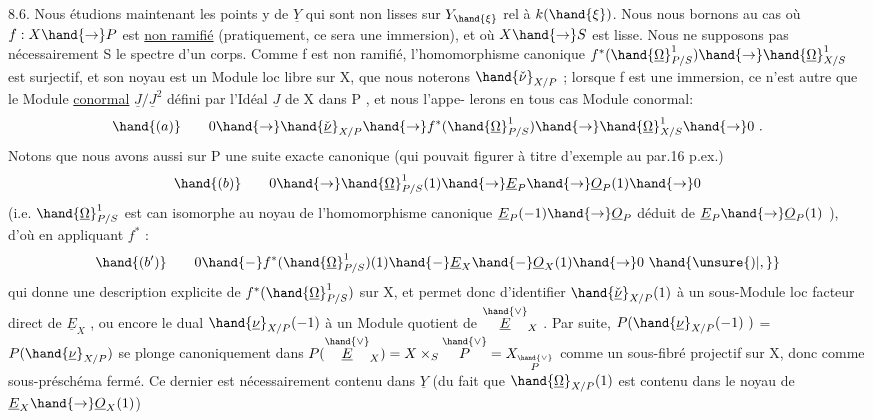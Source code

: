 
8.6. Nous étudions maintenant les points  y de $\underline{Y}$ qui sont non lisses
sur $Y_{\hand{\xi}}$ rel à $k(\hand{\xi})$. Nous nous  bornons au cas où  $f:X\hand{\to} P$  est \uline{non ramifié}
(pratiquement, ce sera une immersion), et où $X\hand{\to} S$ est lisse.  Nous ne
supposons pas nécessairement S le spectre d'un corps.  
 Comme
f  est non ramifié, l'homomorphisme canonique   $f^*(\hand{\underline{\Omega}}^1_{P/S})\hand{\to}\hand{\underline{\Omega}}^1_{X/S}$
est surjectif, et son noyau est un Module loc libre sur X, que nous
noterons  $\hand{\check{\nu}}_{X/P}$ ; lorsque f est une immersion, ce n'est autre que le
Module \uline{conormal}  $\underline{J}/\underline{J}^2$  défini par l'Idéal $\underline{J}$ de X dans P , et nous l'appe-%
lerons en tous cas Module conormal:
\[ \hand{(a)} \qquad 0\hand{\to}\hand{\check{\underline{\nu}}}_{X/P}\hand{\to} f^*(\hand{\underline{\Omega}}^1_{P/S})\hand{\to}\hand{\underline{\Omega}}^1_{X/S}\hand{\to} 0 \ . \]
\placedmargin{\hand{$|||$}}
Notons que nous avons aussi sur  P  une suite exacte canonique
(qui pouvait figurer à titre d'exemple au par.16 p.ex.)
\[ \hand{(b)} \qquad 0\hand{\to}\hand{\underline{\Omega}}^1_{P/S}(1)\hand{\to}\underline{E}_P\hand{\to}\underline{O}_P(1)\hand{\to} 0 \]
(i.e. $\hand{\underline{\Omega}}^1_{P/S}$ est can isomorphe au noyau de l'homomorphisme canonique
$\underline{E}_P(-1)\hand{\to}\underline{O}_P$  déduit de $\underline{E}_P\hand{\to}\underline{O}_P(1)$ ), d'où en appliquant $f^*$ :
\[ \hand{(b')} \qquad 0 \hand{-} f^*(\hand{\underline{\Omega}}^1_{P/S})(1) \hand{-} \underline{E}_X \hand{-} \underline{O}_X(1)\hand{\to} 0 \ \hand{\unsure{)|,}} \]
qui donne une description explicite de  $f^*(\hand{\underline{\Omega}}^1_{P/S})$   sur X, et
permet  donc d'identifier $\hand{\check{\underline{\nu}}}_{X/P}(1)$  à un sous-Module loc facteur direct
de $\underline{E}_X$ , ou encore le  dual  $\hand{\underline{\nu}}_{X/P}(-1)$  à un Module
quotient de $\overset{\hand{\vee}}{\underline{E}}_X$ .  Par suite,   $P(\hand{\underline{\nu}}_{X/P}(-1)\ )$  =  $P(\hand{\underline{\nu}}_{X/P})$  se plonge
canoniquement dans  $P(\overset{\hand{\vee}}{\underline{E}}_X) = X\times_S\overset{\hand{\vee}}{P} = X_{\overset{\hand{\vee}}{P}}$ comme un sous-fibré projectif sur
X, donc comme sous-préschéma fermé. Ce dernier est nécessairement contenu
dans $\underline{Y}$  (du fait que $\hand{\underline{\Omega}}_{X/P}(1)$  est contenu dans le noyau de  $\underline{E}_X\hand{\to}\underline{O}_X(1)$)





